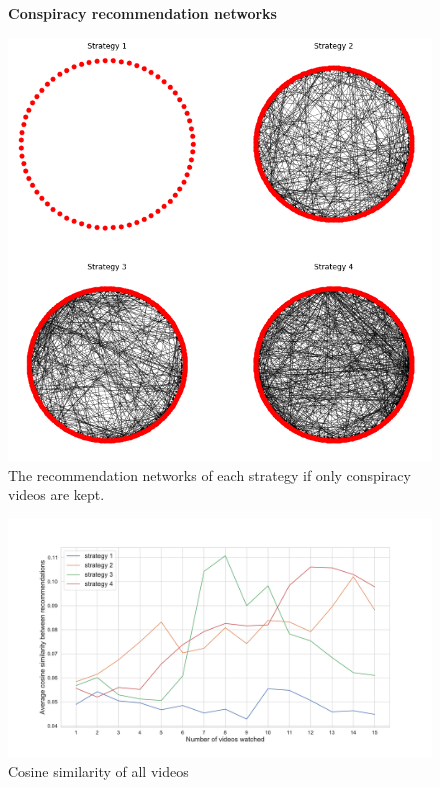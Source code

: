 
\begin{appendices}
\setcounter{table}{1}
\setcounter{figure}{0}

\begin{figure}[h]
  \textbf{Conspiracy recommendation networks}\par\medskip
  \centering
  \includegraphics[keepaspectratio, width=\textwidth]{images/conspiracy networks.png}
  \caption{The recommendation networks of each strategy if only conspiracy videos are kept.}
  \label{appendix:networks}
\end{figure}

\begin{figure}
\centering
\includegraphics[width=\textwidth]{images/All sim.pdf}
\caption{Cosine similarity of all videos}
\label{appendix:all_sim}
\end{figure}



\end{appendices}
